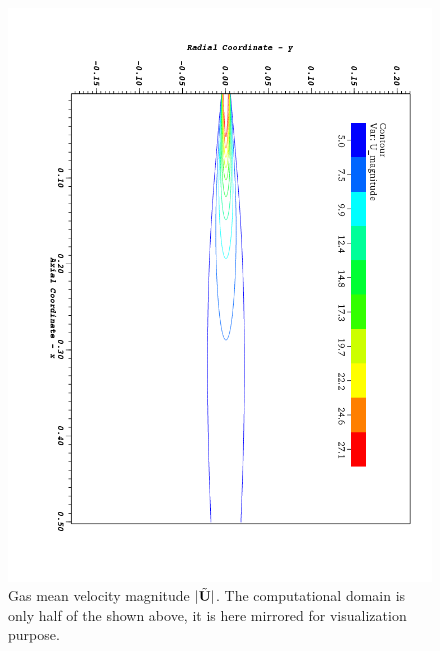 \clearpage
\begin{figure}
\begin{center}
  \includegraphics[height=0.9\textheight]{./figuras/appA2/visit_Ux.png}
 \end{center}
\caption{Gas mean velocity magnitude $|\tilde{\mathbf{U}}|$. The computational domain is only half of the shown above, it is here mirrored for visualization purpose.}
 \label{fig: field_U}
\end{figure}


